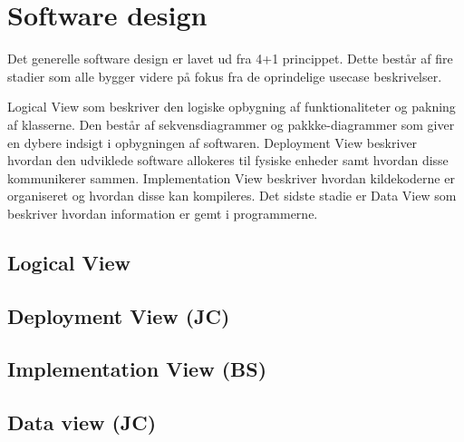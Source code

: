\chapter{Software design}
Det generelle software design er lavet ud fra 4+1 princippet. Dette består af fire stadier som alle bygger videre på fokus fra de oprindelige usecase beskrivelser.

Logical View som beskriver den logiske opbygning af funktionaliteter og pakning af klasserne. Den består af sekvensdiagrammer og pakkke-diagrammer som giver en dybere indsigt i opbygningen af softwaren.\newline
Deployment View beskriver hvordan den udviklede software allokeres til fysiske enheder samt hvordan disse kommunikerer sammen.\newline
Implementation View beskriver hvordan kildekoderne er organiseret og hvordan disse kan kompileres.\newline
Det sidste stadie er Data View som beskriver hvordan information er gemt i programmerne.

\section{Logical View}


\section{Deployment View (JC)}


\section{Implementation View (BS)}

\clearpage
\section{Data view (JC)}


